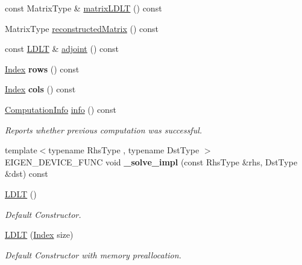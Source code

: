 \begin{DoxyCompactItemize}
\item 
const Matrix\+Type \& \hyperlink{group___cholesky___module_aa5e0fd09dcd5251a8521fa248b95db0b}{matrix\+L\+D\+LT} () const
\item 
Matrix\+Type \hyperlink{group___cholesky___module_ae3693372ca29f50d87d324dfadaae148}{reconstructed\+Matrix} () const
\item 
const \hyperlink{group___cholesky___module_class_eigen_1_1_l_d_l_t}{L\+D\+LT} \& \hyperlink{group___cholesky___module_ac656a209860fa0c6a8faa8bb9f9a06ef}{adjoint} () const
\item 
\mbox{\label{group___cholesky___module_a96efc3befd020e2260ea1cb6f35769a2}} 
\hyperlink{group___cholesky___module_ad9c57eb2fb3bbccd51b9d2e111bea355}{Index} {\bfseries rows} () const
\item 
\mbox{\label{group___cholesky___module_ae848b7d0c0c7dfb3d029a875363c7848}} 
\hyperlink{group___cholesky___module_ad9c57eb2fb3bbccd51b9d2e111bea355}{Index} {\bfseries cols} () const
\item 
\hyperlink{group__enums_ga85fad7b87587764e5cf6b513a9e0ee5e}{Computation\+Info} \hyperlink{group___cholesky___module_a6bd6008501a537d2e16ea672a853bf3e}{info} () const
\begin{DoxyCompactList}\small\item\em Reports whether previous computation was successful. \end{DoxyCompactList}\item 
\mbox{\label{group___cholesky___module_aa885aa88ba1781f14c96ebb0a581a5e0}} 
{\footnotesize template$<$typename Rhs\+Type , typename Dst\+Type $>$ }\\E\+I\+G\+E\+N\+\_\+\+D\+E\+V\+I\+C\+E\+\_\+\+F\+U\+NC void {\bfseries \+\_\+solve\+\_\+impl} (const Rhs\+Type \&rhs, Dst\+Type \&dst) const
\item 
\hyperlink{group___cholesky___module_a2e06dedd2651649c5b251fbf9ba4e7d4}{L\+D\+LT} ()
\begin{DoxyCompactList}\small\item\em Default Constructor. \end{DoxyCompactList}\item 
\hyperlink{group___cholesky___module_a154aa41bd2460199d48861eaf5e4f597}{L\+D\+LT} (\hyperlink{group___cholesky___module_ad9c57eb2fb3bbccd51b9d2e111bea355}{Index} size)
\begin{DoxyCompactList}\small\item\em Default Constructor with memory preallocation. \end{DoxyCompactList}\item 

\end{DoxyCompactItemize}
